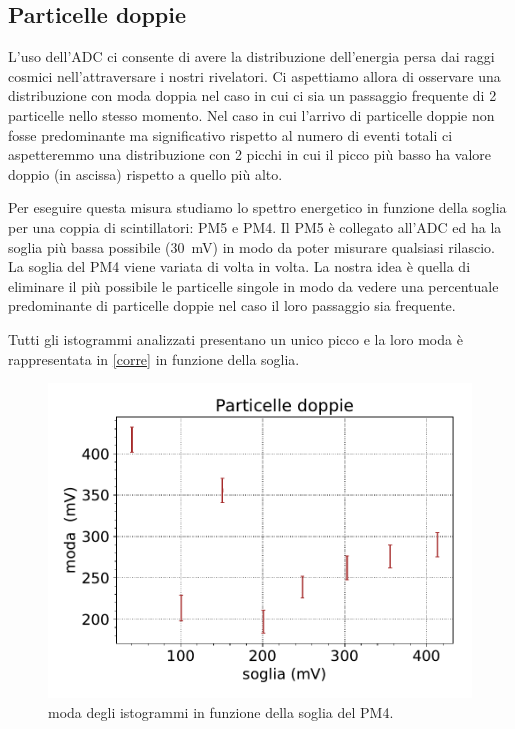 \subsection{Particelle doppie}

L'uso dell'ADC ci consente di avere la distribuzione dell'energia persa dai raggi cosmici nell'attraversare i nostri rivelatori. Ci aspettiamo allora di osservare una distribuzione con moda doppia nel caso in cui ci sia un passaggio frequente di 2 particelle nello stesso momento. Nel caso in cui l'arrivo di particelle doppie non fosse predominante ma significativo rispetto al numero di eventi totali ci aspetteremmo una distribuzione con 2 picchi in cui il picco più basso ha valore doppio (in ascissa) rispetto a quello più alto.

Per eseguire questa misura studiamo lo spettro energetico in funzione della soglia per una coppia di scintillatori: PM5 e PM4. Il PM5 è collegato all'ADC ed ha la soglia più bassa possibile (\SI{30}{mV}) in modo da poter misurare qualsiasi rilascio. La soglia del PM4 viene variata di volta in volta.   La nostra idea  è quella di eliminare il più possibile le particelle singole 
in modo da vedere una percentuale predominante di particelle doppie nel caso il loro passaggio sia frequente.

Tutti gli istogrammi analizzati presentano un unico picco e la loro moda è rappresentata in \autoref{corre} in funzione della soglia.

\begin{figure}[h]
\centering
\includegraphics[width=10 cm]{doppie}
\caption{moda degli istogrammi in funzione della soglia del PM4.}
\label{corre}
\end{figure}


